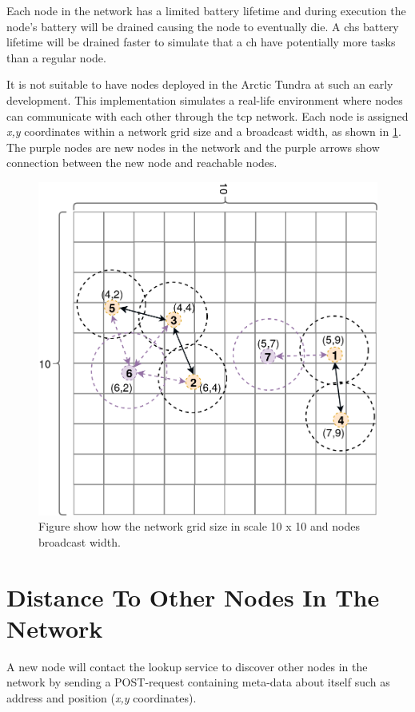 \documentclass[USenglish]{uit-thesis}
\begin{document}
Each node in the network has a limited battery lifetime and during execution the node's battery will be drained causing the node to eventually die. A \glspl{ch} battery lifetime will be drained faster to simulate that a \gls{ch} have potentially more tasks than a regular node.

It is not suitable to have nodes deployed in the Arctic Tundra at such an early development. This implementation simulates a real-life environment where nodes can communicate with each other through the \gls{tcp} network. Each node is assigned \textit{x,y} coordinates within a network grid size and a broadcast width, as shown in \ref{fig:broadcastNeighbour2}. The purple nodes are new nodes in the network and the purple arrows show connection between the new node and reachable nodes.


\begin{figure}
\centering
\includegraphics[scale=0.26]{contactNewNeighbour_3.png}
\caption{Figure show how the network grid size in scale 10 x 10 and nodes broadcast width.}
\label{fig:broadcastNeighbour2}
\end{figure}



\section{Distance To Other Nodes In The Network}
A new node will contact the lookup service to discover other nodes in the network by sending a POST-request containing meta-data about itself such as address and position (\textit{x,y} coordinates).
\end{document}
